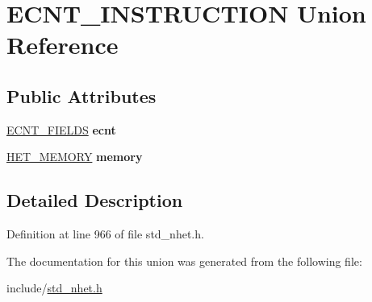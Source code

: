 \hypertarget{unionECNT__INSTRUCTION}{}\section{E\+C\+N\+T\+\_\+\+I\+N\+S\+T\+R\+U\+C\+T\+I\+ON Union Reference}
\label{unionECNT__INSTRUCTION}
\subsection*{Public Attributes}
\begin{DoxyCompactItemize}
\item 
\mbox{\label{unionECNT__INSTRUCTION_a19b79c8f0a9fd2c74af8d4d2c5d78e2a}} 
\mbox{\hyperlink{structecnt__format}{E\+C\+N\+T\+\_\+\+F\+I\+E\+L\+DS}} {\bfseries ecnt}
\item 
\mbox{\label{unionECNT__INSTRUCTION_a526daaf1268ac8643e1525ddeb97855d}} 
\mbox{\hyperlink{structmemory__format}{H\+E\+T\+\_\+\+M\+E\+M\+O\+RY}} {\bfseries memory}
\end{DoxyCompactItemize}


\subsection{Detailed Description}


Definition at line 966 of file std\+\_\+nhet.\+h.



The documentation for this union was generated from the following file\+:\begin{DoxyCompactItemize}
\item 
include/\mbox{\hyperlink{std__nhet_8h}{std\+\_\+nhet.\+h}}\end{DoxyCompactItemize}
